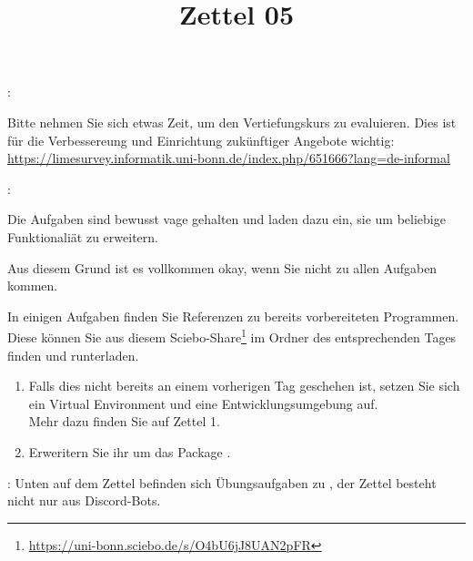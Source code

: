 \documentclass{ubo_tex_uebungszettel/uebungszettel}
\title{Zettel 05}
\theoremstyle{definition}
\newcommand{\pp}[1]{\lpl{#1}}
\newcommand{\furl}[1]{\footnote{\url{#1}}}
\begin{document}
	\maketitle


    \noindent {}: \quad
	
	\noindent Bitte nehmen Sie sich etwas Zeit, um den Vertiefungskurs zu evaluieren. Dies ist für die Verbessereung und Einrichtung zukünftiger Angebote wichtig:\\
    \underline{\url{https://limesurvey.informatik.uni-bonn.de/index.php/651666?lang=de-informal}}

	\medskip
    \medskip
	
	\noindent {}: \quad
	
	\noindent Die Aufgaben sind bewusst vage gehalten und laden dazu ein, sie um beliebige Funktionaliät zu erweitern.
	
	\noindent Aus diesem Grund ist es vollkommen okay, wenn Sie nicht zu allen Aufgaben kommen.
	
	\noindent In einigen Aufgaben finden Sie Referenzen zu bereits vorbereiteten Programmen. Diese können Sie aus diesem Sciebo-Share\furl{https://uni-bonn.sciebo.de/s/O4bU6jJ8UAN2pFR} im Ordner des entsprechenden Tages finden und runterladen.
	
	\medskip
	
	
	\noindent {} \quad
	
    \begin{enumerate}
	\item Falls dies nicht bereits an einem vorherigen Tag geschehen ist, setzen Sie sich ein Virtual Environment und eine Entwicklungsumgebung auf.\\
	Mehr dazu finden Sie auf Zettel 1.
	
	\item Erweritern Sie ihr \pp{venv} um das Package \pp{discord.py}.
\end{enumerate}

\medskip


\noindent {}: Unten auf dem Zettel befinden sich Übungsaufgaben zu , der Zettel besteht nicht nur aus Discord-Bots.
	
	\medskip
	
\end{document}
